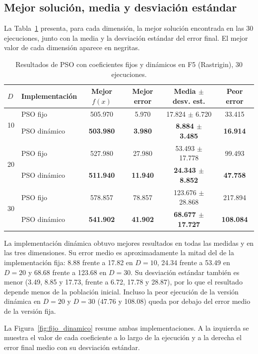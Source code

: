 \subsection{Mejor solución, media y desviación estándar}

La Tabla~\ref{tab:fijo_dinamico} presenta, para cada dimensión, la mejor solución encontrada en las 30 ejecuciones, junto con la media y la desviación estándar del error final. El mejor valor de cada dimensión aparece en negritas.

\begin{table}[H]
\centering
\caption{Resultados de PSO con coeficientes fijos y dinámicos en F5 (Rastrigin), 30 ejecuciones.}
\label{tab:fijo_dinamico}
\small
\setlength{\tabcolsep}{4pt}
\begin{tabular}{llcccc}
\toprule
$D$ & Implementación & Mejor $f(x)$ & Mejor error & Media $\pm$ desv. est. & Peor error \\
\midrule
\multirow{2}{*}{10} & PSO fijo & 505.970 & 5.970 & 17.824 $\pm$ 6.720 & 33.415 \\
 & PSO dinámico & \textbf{503.980} & \textbf{3.980} & \textbf{8.884 $\pm$ 3.485} & \textbf{16.914} \\
\midrule
\multirow{2}{*}{20} & PSO fijo & 527.980 & 27.980 & 53.493 $\pm$ 17.778 & 99.493 \\
 & PSO dinámico & \textbf{511.940} & \textbf{11.940} & \textbf{24.343 $\pm$ 8.852} & \textbf{47.758} \\
\midrule
\multirow{2}{*}{30} & PSO fijo & 578.857 & 78.857 & 123.676 $\pm$ 28.868 & 217.894 \\
 & PSO dinámico & \textbf{541.902} & \textbf{41.902} & \textbf{68.677 $\pm$ 17.727} & \textbf{108.084} \\
\bottomrule
\end{tabular}
\end{table}

La implementación dinámica obtuvo mejores resultados en todas las medidas y en las tres dimensiones. Su error medio es aproximadamente la mitad del de la implementación fija: 8.88 frente a 17.82 en $D=10$, 24.34 frente a 53.49 en $D=20$ y 68.68 frente a 123.68 en $D=30$. Su desviación estándar también es menor (3.49, 8.85 y 17.73, frente a 6.72, 17.78 y 28.87), por lo que el resultado depende menos de la población inicial. Incluso la peor ejecución de la versión dinámica en $D=20$ y $D=30$ (47.76 y 108.08) queda por debajo del error medio de la versión fija.

La Figura~\ref{fig:fijo_dinamico} resume ambas implementaciones. A la izquierda se muestra el valor de cada coeficiente a lo largo de la ejecución y a la derecha el error final medio con su desviación estándar.

